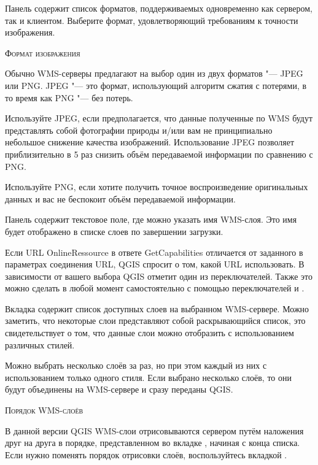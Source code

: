 
Панель  содержит список форматов,
поддерживаемых одновременно как сервером, так и клиентом.
Выберите формат, удовлетворяющий требованиям к точности изображения.

\begin{Tip}[ht]\caption{\textsc{Формат изображения}}
Обычно WMS-серверы предлагают на выбор один из двух форматов "--- JPEG или PNG.
JPEG "--- это формат, использующий алгоритм сжатия с потерями, в то время
как PNG "--- без потерь.

Используйте JPEG, если предполагается, что данные полученные по WMS
будут представлять собой фотографии природы и/или вам не принципиально
небольшое снижение качества изображений. Использование JPEG позволяет
приблизительно в 5 раз снизить объём передаваемой информации по сравнению
с PNG.

Используйте PNG, если хотите получить точное воспроизведение оригинальных
данных и вас не беспокоит объём передаваемой информации. 
\end{Tip}


Панель содержит текстовое поле, где можно указать имя
WMS-слоя. Это имя будет отображено в списке слоев по завершении загрузки.

Если URL OnlineRessource в ответе GetCapabilities отличается от заданного в
параметрах соединения URL, QGIS спросит о том, какой URL использовать.
В зависимости от вашего выбора QGIS отметит один из переключателей. Также это
можно сделать в любой момент самостоятельно с помощью переключателей
 и .

 \label{ogc-wms-layers}

Вкладка  содержит список доступных слоев на выбранном WMS-сервере.
Можно заметить, что некоторые слои представляют собой раскрывающийся список,
это свидетельствует о том, что данные слои можно отобразить с использованием
различных стилей.

Можно выбрать несколько слоёв за раз, но при этом каждый из них с
использованием только одного стиля. Если выбрано несколько слоёв, то
они будут объединены на WMS-сервере и сразу переданы QGIS.

\begin{Tip}[ht]\caption{\textsc{Порядок WMS-слоёв}}
В данной версии QGIS WMS-слои отрисовываются сервером путём наложения
друг на друга в порядке, представленном во вкладке , начиная с конца
списка. Если нужно поменять порядок отрисовки слоёв, воспользуйтесь вкладкой
.
\end{Tip}

